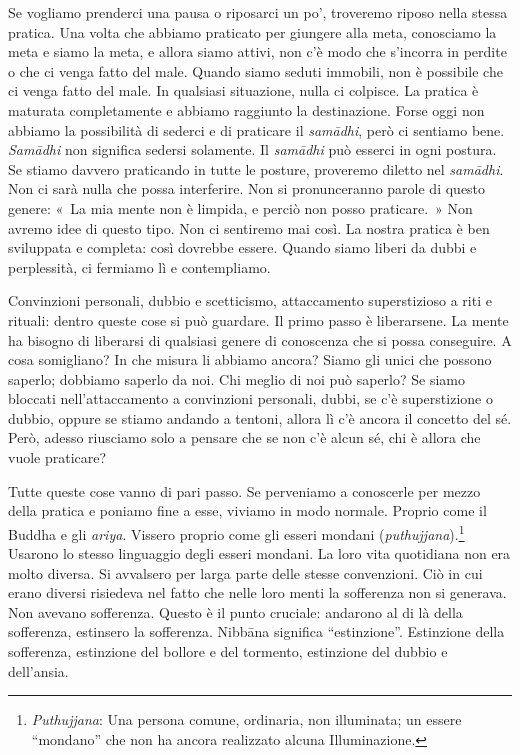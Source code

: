Se vogliamo prenderci una pausa o riposarci un po', troveremo riposo
nella stessa pratica. Una volta che abbiamo praticato per giungere alla
meta, conosciamo la meta e siamo la meta, e allora siamo attivi, non c'è
modo che s'incorra in perdite o che ci venga fatto del male. Quando
siamo seduti immobili, non è possibile che ci venga fatto del male. In
qualsiasi situazione, nulla ci colpisce. La pratica è maturata
completamente e abbiamo raggiunto la destinazione. Forse oggi non
abbiamo la possibilità di sederci e di praticare il \emph{samādhi}, però
ci sentiamo bene. \emph{Samādhi} non significa sedersi solamente. Il
\emph{samādhi} può esserci in ogni postura. Se stiamo davvero praticando
in tutte le posture, proveremo diletto nel \emph{samādhi}. Non ci sarà
nulla che possa interferire. Non si pronunceranno parole di questo
genere: «~La mia mente non è limpida, e perciò non posso praticare.~»
Non avremo idee di questo tipo. Non ci sentiremo mai così. La nostra
pratica è ben sviluppata e completa: così dovrebbe essere. Quando siamo
liberi da dubbi e perplessità, ci fermiamo lì e contempliamo.

Convinzioni personali, dubbio e scetticismo, attaccamento superstizioso
a riti e rituali: dentro queste cose si può guardare. Il primo passo è
liberarsene. La mente ha bisogno di liberarsi di qualsiasi genere di
conoscenza che si possa conseguire. A cosa somigliano? In che misura li
abbiamo ancora? Siamo gli unici che possono saperlo; dobbiamo saperlo da
noi. Chi meglio di noi può saperlo? Se siamo bloccati nell'attaccamento
a convinzioni personali, dubbi, se c'è superstizione o dubbio, oppure se
stiamo andando a tentoni, allora lì c'è ancora il concetto del sé. Però,
adesso riusciamo solo a pensare che se non c'è alcun sé, chi è allora
che vuole praticare?

Tutte queste cose vanno di pari passo. Se perveniamo a conoscerle per
mezzo della pratica e poniamo fine a esse, viviamo in modo normale.
Proprio come il Buddha e gli \emph{ariya}. Vissero proprio come gli
esseri mondani (\emph{puthujjana}).\footnote{\emph{Puthujjana}: Una
  persona comune, ordinaria, non illuminata; un essere ``mondano'' che
  non ha ancora realizzato alcuna Illuminazione.} Usarono lo stesso
linguaggio degli esseri mondani. La loro vita quotidiana non era molto
diversa. Si avvalsero per larga parte delle stesse convenzioni. Ciò in
cui erano diversi risiedeva nel fatto che nelle loro menti la sofferenza
non si generava. Non avevano sofferenza. Questo è il punto cruciale:
andarono al di là della sofferenza, estinsero la sofferenza.
Nibbāna significa ``estinzione''. Estinzione della sofferenza,
estinzione del bollore e del tormento, estinzione del dubbio e
dell'ansia.

